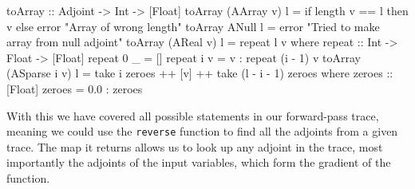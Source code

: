 \begin{haskell}
            toArray :: Adjoint -> Int -> [Float]
            toArray (AArray v) l =
                if   length v == l
                then v
                else error "Array of wrong length"
            toArray ANull        l = error "Tried to make array from null adjoint"
            toArray (AReal v)    l = repeat l v
                where
                    repeat :: Int -> Float -> [Float]
                    repeat 0 _ = []
                    repeat i v = v : repeat (i - 1) v
            toArray (ASparse i v) l = take i zeroes ++ [v] ++ take (l - i - 1) zeroes
                where
                    zeroes :: [Float]
                    zeroes = 0.0 : zeroes
        \end{haskell}

        With this we have covered all possible statements in our forward-pass trace, meaning we could use the \texttt{reverse} function to find all the adjoints from a given trace.
        The map it returns allows us to look up any adjoint in the trace, most importantly the adjoints of the input variables, which form the gradient of the function.